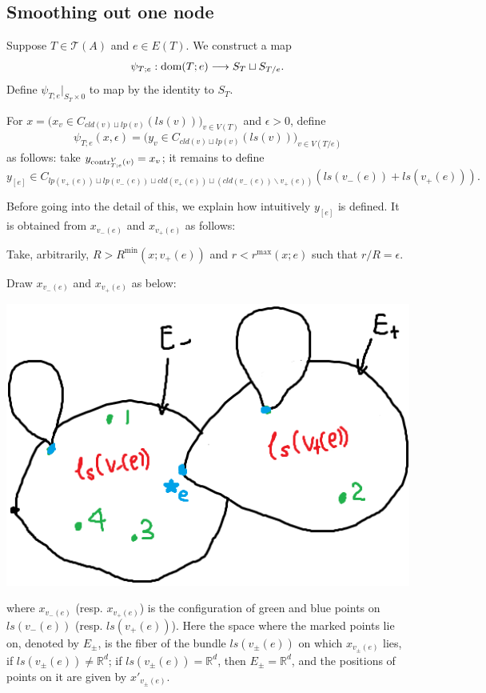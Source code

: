 \documentclass[11pt]{article}
\theoremstyle{definition}
\theoremstyle{remark}
\def\R{\mathbb{R}}
\def\cT{\mathcal{T}}
\def\dom{{\tn{dom}}}
\def\tn#1{\textnormal{#1}}
\begin{document}
\subsection{Smoothing out one node}

Suppose $T\in\cT(A)$ and $e\in E(T)$. 
We construct a map 
$$\psi_{T;e}: \dom(T;e)\longrightarrow S_T\sqcup S_{T/e}.$$
Define $\psi_{T;e}|_{S_T\times 0}$ to map by the identity to $S_T$. 

For $x=\big(x_v\in C_{cld(v)\sqcup lp(v)}(ls(v))\big)_{v\in V(T)}$ and $\epsilon>0$, define 
$$\psi_{T;e}(x,\epsilon)=\big(y_v\in C_{cld(v)\sqcup lp(v)}(ls(v))\big)_{v\in V(T/e)}$$ 
as follows: 
take $y_{\tn{contr}^V_{T;e}(v)}=x_v$; it remains to define $$y_{[e]}\in C_{lp(v_+(e))\sqcup lp(v_-(e))\sqcup cld(v_+(e))\sqcup (cld(v_-(e))\backslash v_+(e))}(ls(v_-(e))+ls(v_+(e))).$$

Before going into the detail of this, we explain how intuitively $y_{[e]}$ is defined. It is obtained from $x_{v_-(e)}$ and $x_{v_+(e)}$ as follows: 

Take, arbitrarily, $R>R^{\min}(x;v_+(e))$ and $r<r^{\max}(x;e)$ such that $r/R=\epsilon$. 

Draw $x_{v_-(e)}$ and $x_{v_+(e)}$ as below: 

\includegraphics[scale=0.5]{yedfn1_fig}

where $x_{v_-(e)}$ (resp. $x_{v_+(e)}$) is the configuration of green and blue points on $ls(v_-(e))$ (resp. $ls(v_+(e))$). 
Here the space where the marked points lie on, denoted by $E_\pm$, is the fiber of the bundle $ls(v_\pm(e))$ on which $x_{v_\pm(e)}$ lies, if $ls(v_\pm(e))\neq\R^d$; if $ls(v_{\pm}(e))=\R^d$, then $E_\pm=\R^d$, and the positions of points on it are given by $x'_{v_\pm(e)}$. 
\end{document}
